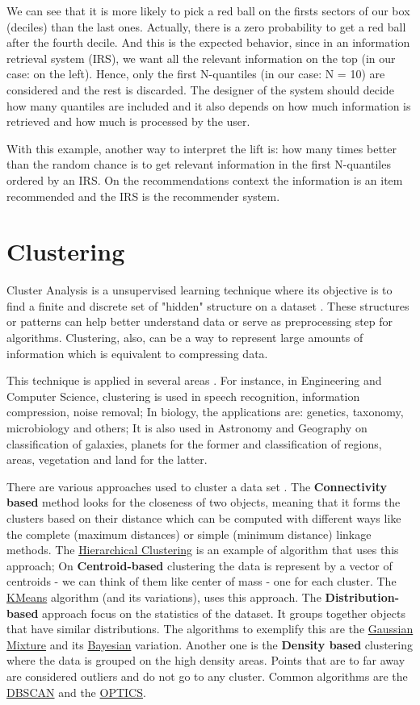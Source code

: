 We can see that it is more likely to pick a red ball on the firsts sectors of our box (deciles) than the last ones. Actually, there is a zero probability to get a red ball after the fourth decile. And this is the expected behavior, since in an information retrieval system (IRS), we want all the relevant information on the top (in our case: on the left). Hence, only the first N-quantiles (in our case: N = 10) are considered and the rest is discarded. The designer of the system should decide how many quantiles are included and it also depends on how much information is retrieved and how much is processed by the user.

With this example, another way to interpret the lift is:  how many times better than the random chance is to get relevant information in the first N-quantiles ordered by an IRS. On the recommendations context the information is an item recommended and the IRS is the recommender system.

\section{Clustering}

Cluster Analysis is a unsupervised learning technique where its objective is to find a finite and discrete set of "hidden" structure on a dataset \cite{xu2008clustering}. These structures or patterns can help better understand data or serve as preprocessing step for algorithms. Clustering, also, can be a way to represent large amounts of information which is equivalent to compressing data. 

This technique is applied in several areas \cite{sabine2001cluster}. For instance, in Engineering and Computer Science, clustering is used in speech recognition, information compression, noise removal; In biology, the applications are: genetics, taxonomy, microbiology and others; It is also used in Astronomy and Geography on classification of galaxies, planets for the former and classification of regions, areas, vegetation and land for the latter.

There are various approaches used to cluster a data set \cite{wikipedia_cluster_analysis}. The \textbf{Connectivity based} method looks for the closeness of two objects, meaning that it forms the clusters based on their distance which can be computed with different ways like the complete (maximum distances) or simple (minimum distance) linkage methods. The \underline{Hierarchical Clustering} is an example of algorithm that uses this approach; On \textbf{Centroid-based} clustering the data is represent by a vector of centroids - we can think of them like center of mass - one for each cluster. The \underline{KMeans} algorithm (and its variations), uses this approach. The \textbf{Distribution-based} approach focus on the statistics of the dataset. It groups together objects that have similar distributions. The algorithms to exemplify this are the \underline{Gaussian Mixture} and its \underline{Bayesian} variation. Another one is the \textbf{Density based} clustering where the data is grouped on the high density areas. Points that are to far away are considered outliers and do not go to any cluster. Common algorithms are the \underline{DBSCAN} and the \underline{OPTICS}.


